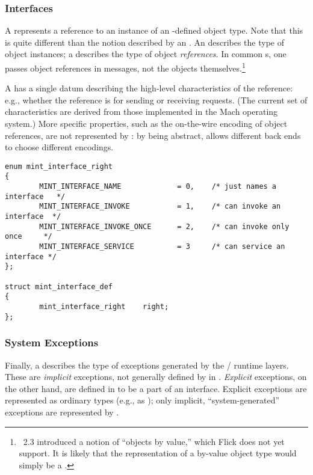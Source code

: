 
\subsubsection{Interfaces}

A  represents a reference to an instance of an
\IDL{}-defined object type.  Note that this is quite different than the notion
described by an .  An  describes the type
of object instances; a  describes the type of object
\emph{references}.  In common \IDL{}s, one passes object references in
messages, not the objects themselves.\footnote{\CORBA{}~2.3 introduced a notion
of ``objects by value,'' which Flick does not yet support.  It is likely that
the \MINT{} representation of a by-value object type would simply be a
.}

A  has a single datum describing the high-level \RPC{}
characteristics of the reference: e.g., whether the reference is for sending or
receiving requests.  (The current set of characteristics are derived from those
implemented in the Mach operating system.)  More specific properties, such as
the on-the-wire encoding of object references, are not represented by \MINT{}:
by being abstract, \MINT{} allows different back ends to choose different
encodings.

\begin{verbatim}
enum mint_interface_right
{
        MINT_INTERFACE_NAME             = 0,    /* just names a interface   */
        MINT_INTERFACE_INVOKE           = 1,    /* can invoke an interface  */
        MINT_INTERFACE_INVOKE_ONCE      = 2,    /* can invoke only once     */
        MINT_INTERFACE_SERVICE          = 3     /* can service an interface */
};

struct mint_interface_def
{
        mint_interface_right    right;
};
\end{verbatim}


\subsubsection{System Exceptions}

Finally, a  describes the type of exceptions
generated by the \RPC{}/\RMI{} runtime layers.  These are \emph{implicit}
exceptions, not generally defined by in \IDL{}\@.  \emph{Explicit} exceptions,
on the other hand, are defined in \IDL{} to be a part of an interface.
Explicit exceptions are represented as ordinary \MINT{} types (e.g., as
); only implicit, ``system-generated'' exceptions are
represented by .

